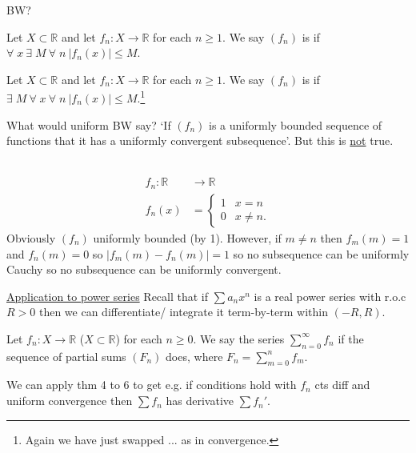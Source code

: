     BW?

    \begin{definition}
        Let $X \subset \mathbb{R}$ and let $f_n : X \to \mathbb{R}$ for each $n \geq 1$.
        We say $(f_n)$ is  if $\forall \; x \ \exists \; M \ \forall \; n \ |f_n(x)| \leq M$.
    \end{definition} 

    \begin{definition}
        Let $X \subset \mathbb{R}$ and let $f_n : X \to \mathbb{R}$ for each $n \geq 1$.
        We say $(f_n)$ is  if $\exists \; M \ \forall \; x \ \forall \; n \ |f_n(x)| \leq M$.\footnote{Again we have just swapped ... as in convergence.}
    \end{definition} 
    
    What would uniform BW say?
    `If $(f_n)$ is a uniformly bounded sequence of functions that it has a uniformly convergent subsequence'.
    But this is \underline{not} true.

    \begin{example}[Counterexample of BW] ~\vspace*{-1.5\baselineskip}
        \begin{align*}
            f_n : \mathbb{R} &\to \mathbb{R} \\
            f_n(x) &= \begin{cases}
                1 & x = n \\
                0 & x \neq n.
            \end{cases}
        \end{align*} 
        Obviously $(f_n)$ uniformly bounded (by 1).
        However, if $m \neq n$ then $f_m(m) = 1$ and $f_n(m) = 0$ so $|f_m(m) - f_n(m)| = 1$ so no subsequence can be uniformly Cauchy so no subsequence can be uniformly convergent.
    \end{example} 

    \underline{Application to power series}
    Recall that if $\sum a_n x^n$ is a real power series with r.o.c $R > 0$ then we can differentiate/ integrate it term-by-term within $(-R, R)$.

    \begin{definition}
        Let $f_n : X \to \mathbb{R}$ ($X \subset \mathbb{R}$) for each $n \geq 0$.
        We say the series $\sum_{n=0}^{\infty} f_n$  if the sequence of partial sums $(F_n)$ does, where $F_n = \sum_{m=0}^{n} f_m$.
    \end{definition} 
    We can apply thm 4 to 6 to get e.g. if conditions hold with $f_n$ cts diff and uniform convergence then $\sum f_n$ has derivative $\sum f_n'$.

